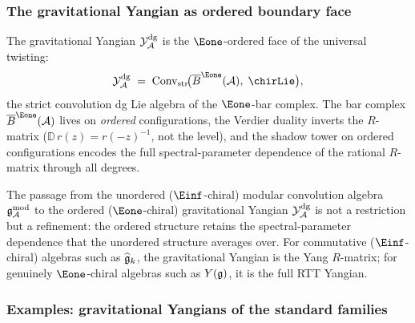 \subsubsection{The gravitational Yangian as ordered boundary face}

\begin{remark}
The gravitational Yangian $\mathcal{Y}^{\mathrm{dg}}_{\mathcal{A}}$ is the $\Eone$-ordered face of
the universal twisting:
\begin{equation}%
\Ydg_\cA
\;=\;
\Convstr\!\bigl(\barB^{\Eone}(\cA),\;\chirLie\bigr),
\end{equation}
the strict convolution dg Lie algebra of the $\Eone$-bar complex.
The bar complex $\barB^{\Eone}(\cA)$ lives on \emph{ordered}
configurations, the Verdier duality inverts the $R$-matrix
($\mathbb{D}\,r(z) = r(-z)^{-1}$, not the level), and the shadow
tower on ordered configurations encodes the full spectral-parameter
dependence of the rational $R$-matrix through all degrees.

The passage from the unordered ($\Einf$-chiral) modular
convolution algebra $\mathfrak{g}_{\mathcal{A}}^{\mathrm{mod}}$ to the ordered ($\Eone$-chiral)
gravitational Yangian $\mathcal{Y}^{\mathrm{dg}}_{\mathcal{A}}$ is not a restriction but a
refinement: the ordered structure retains the spectral-parameter
dependence that the unordered structure averages over. For
commutative ($\Einf$-chiral) algebras such as $\widehat{\mathfrak{g}}_k$,
the gravitational Yangian is the Yang $R$-matrix; for genuinely
$\Eone$-chiral algebras such as $Y(\mathfrak{g})$, it is the full RTT
Yangian.
\end{remark}


\subsubsection{Examples: gravitational Yangians of the standard families}

